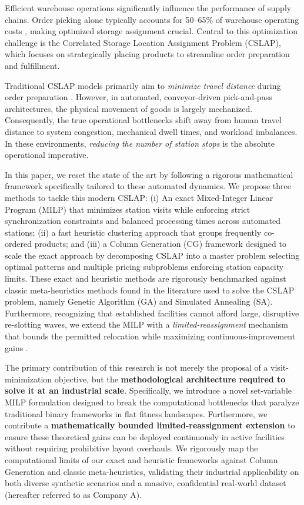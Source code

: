 \documentclass[preprint,review,11pt,authoryear]{elsarticle}
\begin{document}
Efficient warehouse operations significantly influence the performance of supply chains. Order picking alone typically accounts for 50--65\% of warehouse operating costs \cite{xie2024combi}, making optimized storage assignment crucial. Central to this optimization challenge is the Correlated Storage Location Assignment Problem (CSLAP), which focuses on strategically placing products to streamline order preparation and fulfillment.

Traditional CSLAP models primarily aim to \emph{minimize travel distance} during order preparation \cite{islam2023}. However, in automated, conveyor-driven pick-and-pass architectures, the physical movement of goods is largely mechanized. Consequently, the true operational bottlenecks shift away from human travel distance to system congestion, mechanical dwell times, and workload imbalances. In these environments, \emph{reducing the number of station stops} is the absolute operational imperative.

In this paper, we reset the state of the art by following a rigorous mathematical framework specifically tailored to these automated dynamics. We propose three methods to tackle this modern CSLAP: (i) An exact Mixed-Integer Linear Program (MILP) that minimizes station visits while enforcing strict synchronization constraints and balanced processing times across automated stations; (ii) a fast heuristic clustering approach that groups frequently co-ordered products; and (iii) a Column Generation (CG) framework designed to scale the exact approach by decomposing CSLAP into a master problem selecting optimal patterns and multiple pricing subproblems enforcing station capacity limits. These exact and heuristic methods are rigorously benchmarked against classic meta-heuristics methods found in the literature used to solve the CSLAP problem, namely Genetic Algorithm (GA) and Simulated Annealing (SA). Furthermore, recognizing that established facilities cannot afford large, disruptive re-slotting waves, we extend the MILP with a \emph{limited-reassignment} mechanism that bounds the permitted relocation while maximizing continuous-improvement gains \citep{chabot2024reassignment}.

The primary contribution of this research is not merely the proposal of a visit-minimization objective, but the \textbf{methodological architecture required to solve it at an industrial scale}. Specifically, we introduce a novel set-variable MILP formulation designed to break the computational bottlenecks that paralyze traditional binary frameworks in flat fitness landscapes. Furthermore, we contribute a \textbf{mathematically bounded limited-reassignment extension} to ensure these theoretical gains can be deployed continuously in active facilities without requiring prohibitive layout overhauls. We rigorously map the computational limits of our exact and heuristic frameworks against Column Generation and classic meta-heuristics, validating their industrial applicability on both diverse synthetic scenarios and a massive, confidential real-world dataset (hereafter referred to as Company A).
\end{document}
